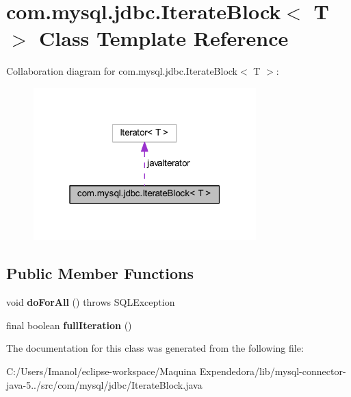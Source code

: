 \hypertarget{classcom_1_1mysql_1_1jdbc_1_1_iterate_block}{}\section{com.\+mysql.\+jdbc.\+Iterate\+Block$<$ T $>$ Class Template Reference}
\label{classcom_1_1mysql_1_1jdbc_1_1_iterate_block}


Collaboration diagram for com.\+mysql.\+jdbc.\+Iterate\+Block$<$ T $>$\+:
\nopagebreak
\begin{figure}[H]
\begin{center}
\leavevmode
\includegraphics[width=244pt]{classcom_1_1mysql_1_1jdbc_1_1_iterate_block__coll__graph}
\end{center}
\end{figure}
\subsection*{Public Member Functions}
\begin{DoxyCompactItemize}
\item 
\mbox{\label{classcom_1_1mysql_1_1jdbc_1_1_iterate_block_a0ea638ee63dc576c4f10588b789714d9}} 
void {\bfseries do\+For\+All} ()  throws S\+Q\+L\+Exception 
\item 
\mbox{\label{classcom_1_1mysql_1_1jdbc_1_1_iterate_block_a93816f057d3461f16fe6eeff2bf3fc1b}} 
final boolean {\bfseries full\+Iteration} ()
\end{DoxyCompactItemize}


The documentation for this class was generated from the following file\+:\begin{DoxyCompactItemize}
\item 
C\+:/\+Users/\+Imanol/eclipse-\/workspace/\+Maquina Expendedora/lib/mysql-\/connector-\/java-\/5../src/com/mysql/jdbc/Iterate\+Block.\+java\end{DoxyCompactItemize}
